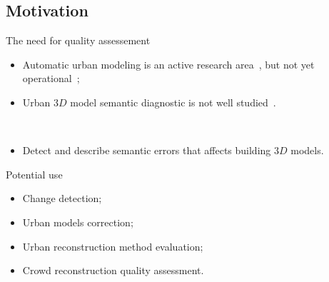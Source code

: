 \documentclass{beamer}
\begin{document}
        \subsection{Motivation}
            \begin{frame}{The need for quality assessement}
                \begin{itemize}[label=$\blacktriangleright$, font=\color{IGNGreen}]
                    \item<1-> Automatic urban modeling is an active research area~\cite{Musialski2012}, but not \textcolor{IGNRed}{yet operational}~\cite{rottensteiner2014results};
                    \item<2-> Urban $3D$ model semantic diagnostic is not well studied~\cite{nguatem2017modeling}.
                \end{itemize}
~\\
                \begin{itemize}[label=Goal $\longrightarrow$, font=\color{purple}, leftmargin=2cm]
                    \item Detect and describe semantic errors that affects building $3D$ models.
                \end{itemize}
            \end{frame}

            \begin{frame}{Potential use}
                \begin{itemize}[label=$\blacktriangleright$, font=\color{IGNGreen}]
                    \item<1-> Change detection;
                    \item<2-> Urban models correction;
                    \item<3-> Urban reconstruction method evaluation;
                    \item<4-> Crowd reconstruction quality assessment.
                \end{itemize}
            \end{frame}
\end{document}
